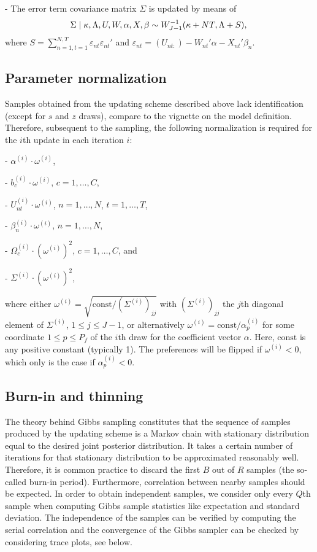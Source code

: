 \documentclass[article]{jss}
\begin{document}
- The error term covariance matrix $\Sigma$ is updated by means of
\begin{equation}
\Sigma \mid \kappa,\Lambda,U,W,\alpha,X,\beta \sim W^{-1}_{J-1}(\kappa+NT,\Lambda+S), \\
\end{equation}
where $S = \sum_{n=1,t=1}^{N,T} \varepsilon_{nt} \varepsilon_{nt}'$ and $\varepsilon_{nt} = (U_{nt:}) - W_{nt}'\alpha - X_{nt}'\beta_n$.

\subsection{Parameter normalization} \label{subsec:parameter_normalization}

Samples obtained from the updating scheme described above lack identification (except for $s$ and $z$ draws), compare to the vignette on the model definition. Therefore, subsequent to the sampling, the following normalization is required for the $i$th update in each iteration $i$:

- $\alpha^{(i)} \cdot \omega^{(i)}$,

- $b_c^{(i)} \cdot \omega^{(i)}$, $c=1,\dots,C$,

- $U_{nt}^{(i)} \cdot \omega^{(i)}$, $n = 1,\dots,N$, $t = 1,\dots,T$,

- $\beta_n^{(i)} \cdot \omega^{(i)}$, $n = 1,\dots,N$,

- $\Omega_c^{(i)} \cdot (\omega^{(i)})^2$, $c=1,\dots,C$, and

- $\Sigma^{(i)} \cdot (\omega^{(i)})^2$,

where either $\omega^{(i)} = \sqrt{\text{const} / (\Sigma^{(i)})_{jj}}$ with $(\Sigma^{(i)})_{jj}$ the $j$th diagonal element of $\Sigma^{(i)}$, $1\leq j \leq J-1$, or alternatively $\omega^{(i)} = \text{const} / \alpha^{(i)}_p$ for some coordinate $1\leq p \leq P_f$ of the $i$th draw for the coefficient vector $\alpha$. Here, $\text{const}$ is any positive constant (typically 1). The preferences will be flipped if $\omega^{(i)} < 0$, which only is the case if $\alpha^{(i)}_p < 0$.

\subsection{Burn-in and thinning} \label{subsec:burn_thin}

The theory behind Gibbs sampling constitutes that the sequence of samples produced by the updating scheme is a Markov chain with stationary distribution equal to the desired joint posterior distribution. It takes a certain number of iterations for that stationary distribution to be approximated reasonably well. Therefore, it is common practice to discard the first $B$ out of $R$ samples (the so-called burn-in period). Furthermore, correlation between nearby samples should be expected. In order to obtain independent samples, we consider only every $Q$th sample when computing Gibbs sample statistics like expectation and standard deviation. The independence of the samples can be verified by computing the serial correlation and the convergence of the Gibbs sampler can be checked by considering trace plots, see below.
\end{document}
